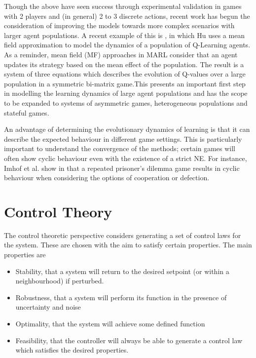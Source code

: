 \documentclass[.../main.tex]{subfiles}
\begin{document}
Though the above have seen success through experimental validation in games with 2 players and (in
general) 2 to 3 discrete actions, recent work has begun the consideration of improving the models
towards more complex scenarios with larger agent populations. A recent example of this is 
\cite{Hu2019}, in which Hu uses a mean field approximation to model the dynamics of a population of
Q-Learning agents. As a reminder, mean field (MF) approaches in MARL consider that an agent updates
its strategy based on the mean effect of the population. The result is a system of three equations
which describes the evolution of Q-values over a large population in a symmetric bi-matrix game.This
presents an important first step in modelling the learning dynamics of large agent populations and
has the scope to be expanded to systems of asymmetric games, heterogeneous populations and stateful
games.

An advantage of determining the evolutionary dynamics of learning is that it can describe the
expected behaviour in different game settings. This is particularly important to understand the
convergence of the methods; certain games will often show cyclic behaviour even with the existence
of a strict NE. For instance, Imhof et al. show in \cite{Imhof2005} that a repeated prisoner's
dilemma game results in cyclic behaviour when considering the options of cooperation or defection.

\section{Control Theory} \label{sec::Control_Theory}

The control theoretic perspective considers generating a set of control laws for the system. These
are chosen with the aim to satisfy certain properties. The main properties are

\begin{itemize}
    \item Stability, that a system will return to the desired setpoint (or within a neighbourhood) if
    perturbed.

    \item Robustness, that a system will perform its function in the presence of uncertainty and
    noise

    \item Optimality, that the system will achieve some defined function 

    \item Feasibility, that the controller will always be able to generate a control law which
    satisfies the desired properties.
\end{itemize}
\end{document}
